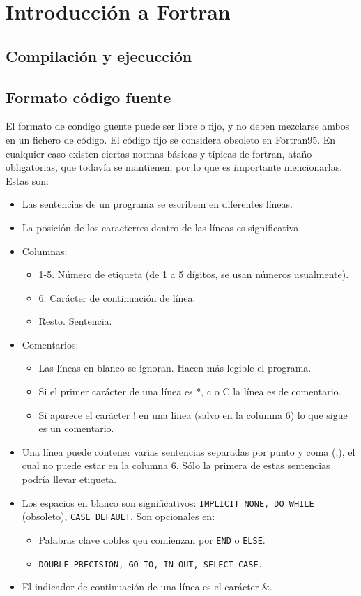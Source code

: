 \chapter{Introducción a Fortran}

\section{Compilación y ejecucción}

\section{Formato código fuente}

El formato de condigo guente puede ser libre o fijo, y no deben mezclarse ambos en un fichero de código. El código fijo se considera obsoleto en Fortran95. En cualquier caso existen ciertas normas básicas y típicas de fortran, ataño obligatorias, que todavía se mantienen, por lo que es importante mencionarlas. Estas son:

\begin{itemize}
    \item Las sentencias de un programa se escribem en diferentes líneas.
    \item La posición de los caracterres dentro de las líneas es significativa.
    \item Columnas:
    \begin{itemize}
        \item 1-5. Número de etiqueta (de 1 a 5 dígitos, se usan números usualmente).
        \item 6. Carácter de continuación de línea.
        \item Resto. Sentencia.
    \end{itemize}
    \item Comentarios:
    \begin{itemize}
        \item Las líneas en blanco se ignoran. Hacen más legible el programa.
        \item Si el primer carácter de una línea es *, c o C la línea es de comentario.
        \item Si aparece el carácter ! en una línea (salvo en la columna 6) lo que sigue es un comentario.
    \end{itemize}
    \item Una línea puede contener varias sentencias separadas por punto y coma (;), el cual no puede estar en la columna 6. Sólo la primera de estas sentencias podría llevar etiqueta.
    \item Los espacios en blanco son significativos: {\tt IMPLICIT NONE, DO WHILE} (obsoleto), {\tt CASE DEFAULT}. Son opcionales en:
    \begin{itemize}
        \item Palabras clave dobles qeu comienzan por {\tt END} o {\tt ELSE}.
        \item {\tt DOUBLE PRECISION, GO TO, IN OUT, SELECT CASE.}
    \end{itemize}
    \item  El indicador de continuación de una línea es el carácter \&.
\end{itemize}


